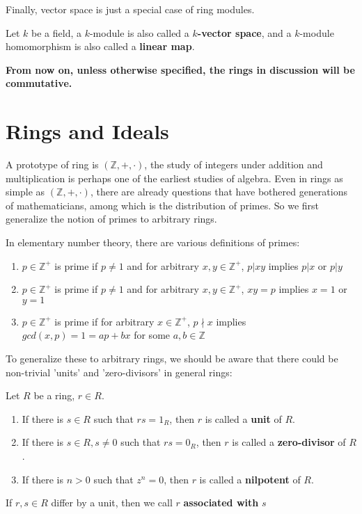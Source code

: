 \documentclass{note-eng}
\begin{document}
Finally, vector space is just a special case of ring modules.

\begin{definition}
    Let $k$ be a field, a $k$-module is also called a \textbf{$k$-vector space}, and a $k$-module homomorphism is also called a \textbf{linear map}.
\end{definition}

{
    \color{red}
    \textbf{From now on, unless otherwise specified, the rings in discussion will be commutative.}
}

\section{Rings and Ideals}

A prototype of ring is $(\mathbb{Z}, +, \cdot)$, the study of integers under addition and multiplication is perhaps one of the earliest studies of algebra. Even in rings as simple as $(\mathbb{Z}, +, \cdot)$, there are already questions that have bothered generations of mathematicians, among which is the distribution of primes. So we first generalize the notion of primes to arbitrary rings.

In elementary number theory, there are various definitions of primes:
\begin{enumerate}
    \item $p \in \mathbb{Z}^+$ is prime if $p \ne 1$ and for arbitrary $x, y \in \mathbb{Z}^+$, $p | xy$ implies $p | x$ or $p | y$
    \item $p \in \mathbb{Z}^+$ is prime if $p \ne 1$ and for arbitrary $x, y \in \mathbb{Z}^+$, $xy = p$ implies $x = 1$ or $y = 1$
    \item $p \in \mathbb{Z}^+$ is prime if for arbitrary $x \in \mathbb{Z}^+$, $p \nmid x$ implies $gcd(x, p) = 1 = ap + bx$ for some $a, b \in \mathbb{Z}$
\end{enumerate}
To generalize these to arbitrary rings, we should be aware that there could be non-trivial 'units' and 'zero-divisors' in general rings:

\begin{definition}
    Let $R$ be a ring, $r \in R$.
    \begin{enumerate}
        \item If there is $s \in R$ such that $rs = 1_R$, then $r$ is called a \textbf{unit} of $R$.
        \item If there is $s \in R, s \ne 0$ such that $rs = 0_R$, then $r$ is called a \textbf{zero-divisor} of $R$.
        \item If there is $n \gt 0$ such that $z^n = 0$, then $r$ is called a \textbf{nilpotent} of $R$.
    \end{enumerate}
    If $r, s \in R$ differ by a unit, then we call $r$ \textbf{associated with} $s$
\end{definition}
\end{document}
